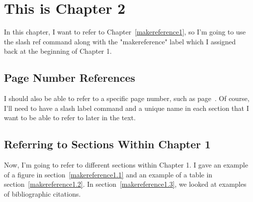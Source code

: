 
\cleardoublepage


\chapter{This is Chapter 2}
\label{makereference2}

In this chapter, I want to refer to Chapter~\ref{makereference1}, so
I'm going to use the slash ref command along with the
"makereference" label which I assigned back at the beginning of
Chapter 1.

\section{Page Number References}
\label{makereference2.1} I should also be able to refer to a
specific page number, such as page~\pageref{makereference1}.  Of
course, I'll need to have a slash label command and a unique name in
each section that I want to be able to refer to later in the text.

\section{Referring to Sections Within Chapter 1}
\label{makereference2.2} Now, I'm going to refer to different
sections within Chapter 1. I gave an example of a figure in
section~\ref{makereference1.1} and an example of a table in
section~\ref{makereference1.2}.  In
section~\ref{makereference1.3}, we looked at examples of
bibliographic citations.

